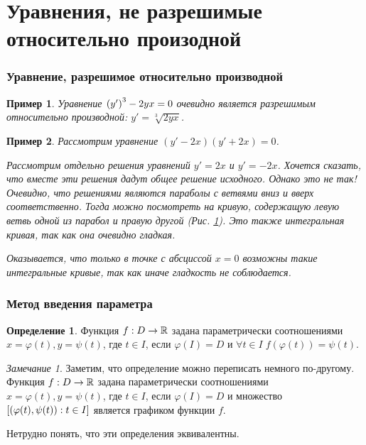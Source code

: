 \documentclass[a5paper, 10pt]{article}
\theoremstyle{definition}
\newtheorem{Def}{Определение}
\theoremstyle{plain}
\newtheorem{Ex}{Пример}
\theoremstyle{remark}
\newtheorem*{Note}{Замечание}
\begin{document}
	\part{Уравнения, не разрешимые относительно произодной}
	\section[Разрешимые уравнения]{Уравнение, разрешимое относительно производной}
	\begin{Ex}
		Уравнение $\left(y'\right)^3 -2yx = 0$ очевидно является разрешимым относительно производной:
		$y' = \sqrt[3]{2yx}$.
	\end{Ex}
	\begin{Ex}\label{ex_4}
		Рассмотрим уравнение $(y'-2x)(y'+2x) = 0$.
		
		Рассмотрим отдельно решения уравнений $y'=2x$ и $y' = -2x$. Хочется сказать, что вместе эти решения дадут общее решение исходного. Однако это не так! Очевидно, что решениями являются параболы с ветвями вниз и вверх соответственно. Тогда можно посмотреть на кривую, содержащую левую ветвь одной из парабол и правую другой (Рис. \ref{pic1}). Это также интегральная кривая, так как она очевидно гладкая.
		\begin{figure}[h!]
			\centering
		\caption{}\label{pic1}
		\end{figure}
		Оказывается, что только в точке с абсциссой $x=0$ возможны такие интегральные кривые, так как иначе гладкость не соблюдается.
	\end{Ex}

	\section{Метод введения параметра}
	\begin{Def}
		Функция $f: D \rightarrow \mathbb{R}$ задана параметрически соотношениями $x = \varphi(t), y = \psi(t)$, где $t\in I$, если $\varphi(I) = D$ и $\forall t\in I \; f(\varphi(t))=\psi(t)$.
	\end{Def}

	\begin{Note}
		Заметим, что определение можно переписать немного по-другому.
		Функция $f: D \rightarrow \mathbb{R}$ задана параметрически соотношениями $x = \varphi(t), y = \psi(t)$, где $t\in I$, если $\varphi(I) = D$ и множество $\left[\left(\varphi(t), \psi(t)\right) : t \in I\right]$ является графиком функции $f$.
		
		Нетрудно понять, что эти определения эквивалентны.
	\end{Note}
\end{document}
